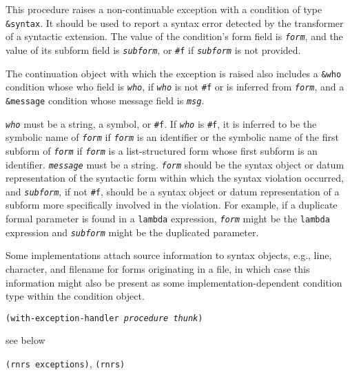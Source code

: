 This procedure raises a non-continuable exception with a condition of type
\texttt{\&{}syntax}.
It should be used to report a syntax error detected by the transformer of
a syntactic extension.
The value of the condition's form field is \texttt{\textit{form}}, and the value of
its subform field is \texttt{\textit{subform}}, or \texttt{\#{}f} if \texttt{\textit{subform}} is
not provided.


The continuation object with which the exception is raised also includes
a \texttt{\&{}who} condition whose who field is \texttt{\textit{who}}, if \texttt{\textit{who}} is
not \texttt{\#{}f} or is inferred from \texttt{\textit{form}}, and a \texttt{\&{}message}
condition whose message field is \texttt{\textit{msg}}.

\texttt{\textit{who}} must be a string, a symbol, or \texttt{\#{}f}.
If \texttt{\textit{who}} is \texttt{\#{}f}, it is inferred to be the symbolic name of \texttt{\textit{form}}
if \texttt{\textit{form}} is an identifier or the symbolic name of the first subform
of \texttt{\textit{form}} if \texttt{\textit{form}} is a list-structured form whose first subform
is an identifier.
\texttt{\textit{message}} must be a string.
\texttt{\textit{form}} should be the syntax object or datum representation of the
syntactic form within which the syntax violation occurred, and
\texttt{\textit{subform}}, if not \texttt{\#{}f}, should be a syntax object or datum
representation of a subform more specifically involved in the violation.
For example, if a duplicate formal parameter is found in a \texttt{lambda} expression,
\texttt{\textit{form}} might be the \texttt{lambda} expression and \texttt{\textit{subform}} might be
the duplicated parameter.

Some implementations attach source information to syntax objects, e.g.,
line, character, and filename for forms originating in a file, in which case
this information might also be present as some implementation-dependent
condition type within the condition object.

\begin{description}

\label{exceptions_s7}\item[procedure] \texttt{(with-exception-handler \textit{procedure} \textit{thunk})}



\item[returns] see below


\item[libraries] \texttt{(rnrs exceptions)}, \texttt{(rnrs)}
\end{description}


